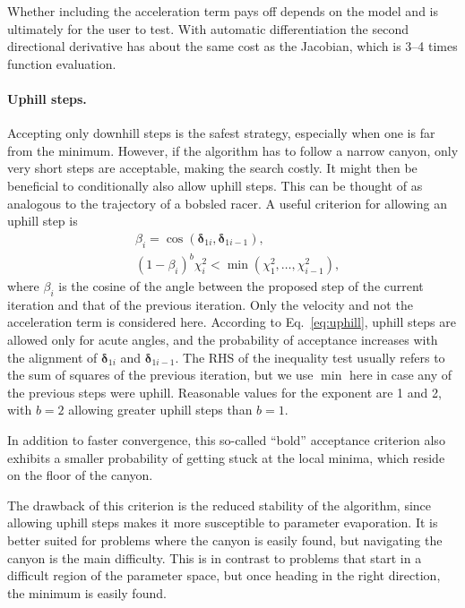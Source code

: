 \documentclass{article}
\begin{document}
Whether including the acceleration term pays off depends on the model and is ultimately for the user to test. With automatic differentiation the second directional derivative has about the same cost as the Jacobian, which is 3--4 times function evaluation.

\paragraph{Uphill steps.} Accepting only downhill steps is the safest strategy, especially when one is far from the minimum. However, if the algorithm has to follow a narrow canyon, only very short steps are acceptable, making the search costly. It might then be beneficial to conditionally also allow uphill steps. This can be thought of as analogous to the trajectory of a bobsled racer. A useful criterion for allowing an uphill step is
\begin{equation}
  \label{eq:uphill}
  \begin{split}
    & \beta_i = \cos(\bm\delta_{1i},\bm\delta_{1i-1}), \\
    & (1-\beta_i)^b\chi_i^2 < \min(\chi_1^2,\ldots,\chi_{i-1}^2),
  \end{split}
\end{equation}
where $\beta_i$ is the cosine of the angle between the proposed step of the current iteration and that of the previous iteration. Only the velocity and not the acceleration term is considered here. According to Eq.~\eqref{eq:uphill}, uphill steps are allowed only for acute angles, and the probability of acceptance increases with the alignment of $\bm\delta_{1i}$ and $\bm\delta_{1i-1}$. The RHS of the inequality test usually refers to the sum of squares of the previous iteration, but we use $\min$ here in case any of the previous steps were uphill. Reasonable values for the exponent are 1 and 2, with $b=2$ allowing greater uphill steps than $b=1$.

In addition to faster convergence, this so-called ``bold'' acceptance criterion also exhibits a smaller probability of getting stuck at the local minima, which reside on the floor of the canyon.

The drawback of this criterion is the reduced stability of the algorithm, since allowing uphill steps makes it more susceptible to parameter evaporation. It is better suited for problems where the canyon is easily found, but navigating the canyon is the main difficulty. This is in contrast to problems that start in a difficult region of the parameter space, but once heading in the right direction, the minimum is easily found.
\end{document}
